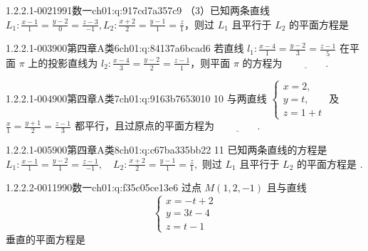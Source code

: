 \begin{q}{1.2.2.1-002}{1991数一}{ch01:q:917cd7a357c9}
（3）已知两条直线 $L_1:\frac{x-1}{1}=\frac{y-2}{0}=\frac{z-3}{-1},L_2:\frac{x+2}{2}=\frac{y-1}{1}=\frac{z}{1}$，则过 $L_1$ 且平行于 $L_2$ 的平面方程是\underline{\hspace{4em}}
\end{q}

\begin{q}{1.2.2.1-003}{900第四章A类6}{ch01:q:84137a6bcad6}
若直线 $l_1:\frac{x-4}{1}=\frac{y-2}{3}=\frac{z-1}{5}$ 在平面 $\pi$ 上的投影直线为 $l_2:\frac{x-4}{3}=\frac{y-2}{2}=\frac{z-1}{1}$，则平面 $\pi$ 的方程为 $\underline{\hspace{4em}}$.
\end{q}

\begin{q}{1.2.2.1-004}{900第四章A类7}{ch01:q:9163b7653010}
10 与两直线 $\begin{cases} x=2,\\ y=t,\\ z=1+t \end{cases}$ 及 $\frac{x}{1}=\frac{y+1}{2}=\frac{z-1}{3}$ 都平行，且过原点的平面方程为 $\underline{\hspace{4em}}$.
\end{q}

\begin{q}{1.2.2.1-005}{900第四章A类8}{ch01:q:c67ba335bb22}
11 已知两条直线的方程是
$\displaystyle L_1:\frac{x-1}{1}=\frac{y-2}{1}=\frac{z-1}{-1},\quad L_2:\frac{x+2}{2}=\frac{y-1}{1}=\frac{z}{1},$
则过 $L_1$ 且平行于 $L_2$ 的平面方程是 \underline{\hspace{4em}}.
\end{q}

\par\addvspace{2.4ex}\noindent
\begin{minipage}{\linewidth}

\begin{q}{1.2.2.2-001}{1990数一}{ch01:q:f35c05ce13e6}
过点 $M(1,2,-1)$ 且与直线 \[\begin{cases} x=-t+2 \\ y=3t-4 \\ z=t-1 \end{cases}\] 垂直的平面方程是 \underline{\hspace{4em}}
\end{q}
\end{minipage}


